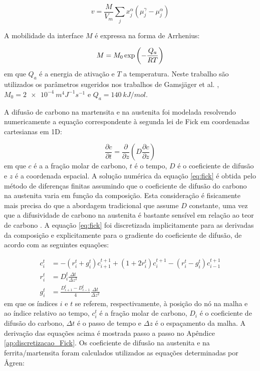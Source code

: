 \begin{equation}
  v = \frac{M}{V_m} \sum_j x_j^\alpha \left( \mu_j^{\gamma} - \mu_j^{\alpha} \right)
  \label{eq:int_velocity}
\end{equation}


A mobilidade da interface $M$ é expressa na forma de Arrhenius:

\begin{equation}
  M = M_0 \exp \left( -\frac{Q_a}{R\*T} \right)
  \label{eq:int_mobility}
\end{equation}
%
em que $Q_a$ é a energia de ativação e $T$ a temperatura. Neste trabalho são utilizados os parâmetros sugeridos nos trabalhos de Gamsjäger et al. \cite{Gamsjager2006,Chen2014}, $M_0 = \SI{2e-4}{m^4J^{-1}s^{-1}}$ e $Q_a = \SI{140}{kJ/mol}$.


A difusão de carbono na martensita e na austenita foi modelada resolvendo numericamente a equação correspondente à segunda lei de Fick em coordenadas cartesianas em 1D:

\begin{equation}
  \frac{\partial c}{\partial t} = \frac{\partial}{\partial z} \left( D \frac{\partial c}{\partial z} \right)
  \label{eq:fick}
\end{equation}
%
em que $c$ é a a fração molar de carbono, $t$ é o tempo, $D$ é o coeficiente de difusão e $z$ é a coordenada espacial. A solução numérica da equação \ref{eq:fick} é obtida pelo método de diferenças finitas assumindo que o coeficiente de difusão do carbono na austenita varia em função da composição. Esta consideração é fisicamente mais precisa do que a abordagem tradicional que assume $D$ constante, uma vez que a difusividade de carbono na austenita é bastante sensível em relação ao teor de carbono \cite{Hillert1993}. A equação \ref{eq:fick} foi discretizada implicitamente para as derivadas da composição e explicitamente para o gradiente do coeficiente de difusão, de acordo com as seguintes equações:

\begin{align}
  c^t_i &= -\left(r^t_i + g^t_i\right) c^{t+1}_{i+1} + \left(1 + 2 r^t_i\right) c^{t+1}_{i} - \left(r^t_i - g^t_i\right) c^{t+1}_{i-1} \\
  r^t_i &= D^t_i \frac{\Delta t}{\Delta z^2} \\
  g^t_i &= \frac{D^t_{i+1} - D^t_{i-1}}{4} \frac{\Delta t}{\Delta z^2} \label{eq:FDM_g}
\end{align}
%
em que os índices $i$ e $t$ se referem, respectivamente, à posição do nó na malha e ao índice relativo ao tempo, $c^t_i$ é a fração molar de carbono, $D_i$ é o coeficiente de difusão do carbono, $\Delta t$ é o passo de tempo e $\Delta z$ é o espaçamento da malha. A derivação das equações acima é mostrada passo a passo no Apêndice \ref{ap:discretizacao_Fick}. Os coeficiente de difusão na austenita e na ferrita/martensita foram calculados utilizados as equações determinadas por {\AA}gren\cite{Agren1982,Agren1986}:

